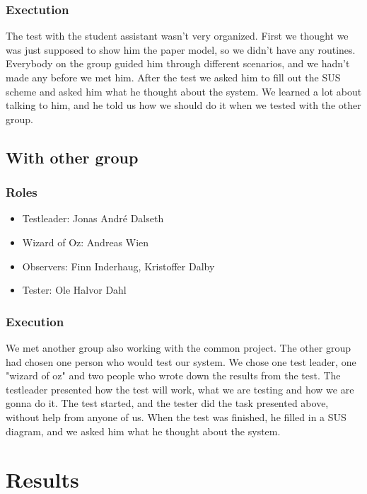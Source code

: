 \documentclass{article}
\begin{document}
\subsubsection*{Exectution}
The test with the student assistant wasn't very organized. First we thought we was just supposed to show him the paper model, so we didn't have any routines. Everybody on the group guided him through different scenarios, and we hadn't made any before we met him. After the test we asked him to fill out the SUS scheme and asked him what he thought about the system. We learned a lot about talking to him, and he told us how we should do it when we tested with the other group. 

\subsection{With other group}
\subsubsection*{Roles}
\begin{itemize}
\item Testleader: Jonas André Dalseth
\item Wizard of Oz: Andreas Wien
\item Observers: Finn Inderhaug, Kristoffer Dalby
\item Tester: Ole Halvor Dahl
\end{itemize}

\subsubsection*{Execution}
We met another group also working with the common project. The other group had chosen one person who would test our system. We chose one test leader, one "wizard of oz" and two people who wrote down the results from the test. The testleader presented how the test will work, what we are testing and how we are gonna do it. The test started, and the tester did the task presented above, without help from anyone of us. When the test was finished, he filled in a SUS diagram, and we asked him what he thought about the system.

\section{Results}
\end{document}
